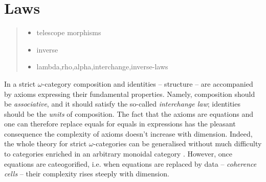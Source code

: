 \section{Laws}
\label{sec:laws}

\begin{quote}
  \begin{itemize}
  \item telescope morphisms
  \item inverse
  \item lambda,rho,alpha,interchange,inverse-laws

  \end{itemize}
\end{quote}

%
In a strict $\omega$-category composition and
identities -- structure -- are accompanied by axioms expressing their fundamental
properties. Namely, composition should be \emph{associative}, and it
should satisfy the so-called \emph{interchange law}; identities should
be the \emph{units} of composition. The fact that the axioms are
equations and one can therefore replace equals for equals in
expressions has the pleasant consequence the
complexity of axioms doesn't increase with dimension. Indeed, the whole theory
for strict $\omega$-categories can be generalised without much difficulty
to categories enriched in an arbitrary monoidal
category \cite{kelly:1982}. However, once equations are cateogorified,
i.e. when equations are replaced by data -- \emph{coherence cells} -- their
complexity rises steeply with dimension. 

